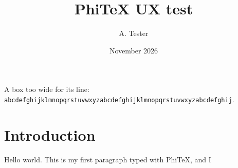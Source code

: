 \documentclass{article}
\title{PhiTeX UX test}
\author{A. Tester}
\date{November 2026}
\begin{document}
\maketitle

\noindent A box too wide for its line: \texttt{abcdefghijklmnopqrstuvwxyzabcdefghijklmnopqrstuvwxyzabcdefghij}.

\section{Introduction}
Hello world. This is my first paragraph typed with PhiTeX, and I
\end{document}
